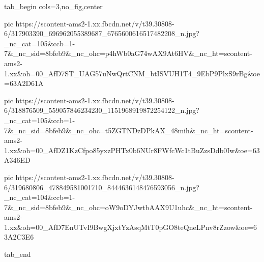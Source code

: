  
 
 
 
 


\ifcmt
  tab_begin cols=3,no_fig,center

     pic https://scontent-ams2-1.xx.fbcdn.net/v/t39.30808-6/317903390_696962055389687_6765600616517482208_n.jpg?_nc_cat=105&ccb=1-7&_nc_sid=8bfeb9&_nc_ohc=p4hWb0aG74wAX9At6HV&_nc_ht=scontent-ams2-1.xx&oh=00_AfD7ST_UAG57uNwQrtCNM_btISVUH1T4_9EbP9PlxS9rBg&oe=63A2D61A

     pic https://scontent-ams2-1.xx.fbcdn.net/v/t39.30808-6/318876509_559057846234230_1151968919872254122_n.jpg?_nc_cat=105&ccb=1-7&_nc_sid=8bfeb9&_nc_ohc=t5ZGTNDzDPkAX_48mih&_nc_ht=scontent-ams2-1.xx&oh=00_AfDZ1KzCfpo85yxzPHTx0b6NUr8FWfcWc1tBuZzsDdb0Iw&oe=63A346ED

     pic https://scontent-ams2-1.xx.fbcdn.net/v/t39.30808-6/319680806_478849581001710_8444636148476593056_n.jpg?_nc_cat=104&ccb=1-7&_nc_sid=8bfeb9&_nc_ohc=oW9oDYJwtbAAX9U1uhc&_nc_ht=scontent-ams2-1.xx&oh=00_AfD7EnUTvI9BwgXjxtYzAsqMtT0pGO8teQneLPnv8rZzow&oe=63A2C3E6

  tab_end
\fi

